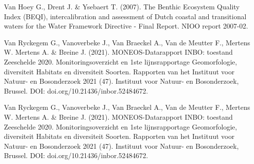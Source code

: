 \documentclass[twoside]{extreport}
\begin{document}
Van Hoey G., Drent J. \& Ysebaert T. (2007). The Benthic Ecosystem
Quality Index (BEQI), intercalibration and assessment of Dutch coastal
and transitional waters for the Water Framework Directive - Final
Report. NIOO report 2007-02.

Van Ryckegem G., Vanoverbeke J., Van Braeckel A., Van de Meutter F.,
Mertens W. Mertens A. \& Breine J. (2021). MONEOS-Datarapport INBO:
toestand Zeeschelde 2020. Monitoringsoverzicht en 1ste lijnsrapportage
Geomorfologie, diversiteit Habitats en diversiteit Soorten. Rapporten
van het Instituut voor Natuur- en Bosonderzoek 2021 (47). Instituut voor
Natuur- en Bosonderzoek, Brussel. DOI: doi.org/10.21436/inbor.52484672.

Van Ryckegem G., Vanoverbeke J., Van Braeckel A., Van de Meutter F.,
Mertens W. Mertens A. \& Breine J. (2021). MONEOS-Datarapport INBO:
toestand Zeeschelde 2020. Monitoringsoverzicht en 1ste lijnsrapportage
Geomorfologie, diversiteit Habitats en diversiteit Soorten. Rapporten
van het Instituut voor Natuur- en Bosonderzoek 2021 (47). Instituut voor
Natuur- en Bosonderzoek, Brussel. DOI: doi.org/10.21436/inbor.52484672.
\end{document}
